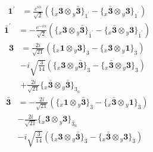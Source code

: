 \documentclass[english]{article}
\newcommand{\rep}[1]{\mathbf{#1}}
\newcommand{\repx}[2]{{}_{#2}\mathbf{#1}}
\newcommand{\tsprodx}[2]{\repx{#1}{x}\otimes\repx{#2}{y}}
\newcommand{\subcgt}[3]{\big\{ \tsprodx{#1}{#2}\big\}^{}_{#3}}
\newcommand{\bfl}{\begin{fleqn}[25pt]}
\newcommand{\efl}{\end{fleqn}}
\begin{document}
\begin{itemize}
\bfl
\begin{align*}
\rep{1^{\prime}} & = \frac{e^{i \alpha }}{\sqrt{2}}\left(\subcgt{3}{\bar{3}}{1^{\prime}}-\subcgt{\bar{3}}{3}{1^{\prime}}\right)
\end{align*}
\begin{align*}
\rep{\bar{1}^{\prime}} & = -\frac{e^{-i \alpha }}{\sqrt{2}}\left(\subcgt{3}{\bar{3}}{\bar{1}^{\prime}}-\subcgt{\bar{3}}{3}{\bar{1}^{\prime}}\right)
\end{align*}
\begin{align*}
\rep{3} & = \frac{2 i}{\sqrt{21}}\left(\subcgt{1}{3}{3}-\subcgt{3}{1}{3}\right) \\ 
 & -i \sqrt{\frac{3}{14}}\left(\subcgt{3}{\bar{3}}{3}-\subcgt{\bar{3}}{3}{3}\right) \\ 
 & +\frac{2 i}{\sqrt{21}}\subcgt{\bar{3}}{\bar{3}}{3_{a}}
\end{align*}
\begin{align*}
\rep{\bar{3}} & = -\frac{2 i}{\sqrt{21}}\left(\subcgt{1}{\bar{3}}{\bar{3}}-\subcgt{\bar{3}}{1}{\bar{3}}\right) \\ 
 & -\frac{2 i}{\sqrt{21}}\subcgt{3}{3}{\bar{3}_{a}} \\ 
 & -i \sqrt{\frac{3}{14}}\left(\subcgt{3}{\bar{3}}{\bar{3}}-\subcgt{\bar{3}}{3}{\bar{3}}\right)
\end{align*}
\efl
\end{itemize}
\end{document}
